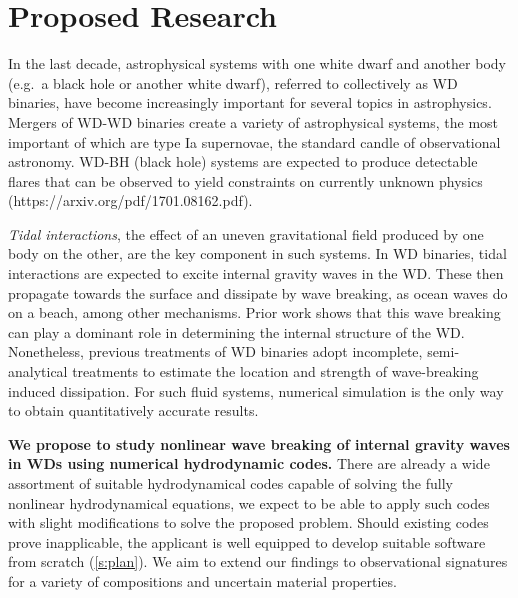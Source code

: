 \documentclass[12pt,
        usenames, %
        dvipsnames %
    ]{article}
\begin{document}
\def\Snospace~{\S{}} %
\renewcommand*{\sectionautorefname}{\Snospace}
\renewcommand*{\appendixautorefname}{\Snospace}
\renewcommand*{\figureautorefname}{Fig.}
\renewcommand*{\equationautorefname}{Eq.}
\renewcommand*{\tableautorefname}{Tab.}

\doublespacing


\section{Proposed Research}

In the last decade, astrophysical systems with one white dwarf and another
body (e.g.\ a black hole or another white dwarf), referred to collectively as WD
binaries, have become increasingly important for several topics in astrophysics.
Mergers of WD-WD binaries create a variety of astrophysical systems, the most
important of which are type Ia supernovae, the standard candle of observational
astronomy. WD-BH (black hole) systems are expected to produce detectable flares
that can be observed to yield constraints on currently unknown physics
(https://arxiv.org/pdf/1701.08162.pdf).

\emph{Tidal interactions}, the effect of an uneven gravitational field produced
by one body on the other, are the key component in such systems. In WD binaries,
tidal interactions are expected to excite internal gravity waves in the WD\@.
These then propagate towards the surface and dissipate by wave breaking, as ocean
waves do on a beach, among other mechanisms.
Prior work shows that this wave breaking can play a dominant role in determining
the internal structure of the WD\@. Nonetheless, previous treatments of WD
binaries adopt incomplete, semi-analytical treatments to estimate the location
and strength of wave-breaking induced dissipation. For such fluid systems,
numerical simulation is the only way to obtain quantitatively accurate results.

\textbf{We propose to study nonlinear wave breaking of internal gravity waves in
WDs using numerical hydrodynamic codes.} There are already a wide assortment of
suitable hydrodynamical codes
capable of solving the fully nonlinear hydrodynamical equations, we expect to be
able to apply such codes with slight modifications to solve the proposed
problem. Should existing codes prove inapplicable, the applicant is well
equipped to develop suitable software from scratch (\autoref{s:plan}). We aim
to extend our findings to observational signatures for a variety of compositions
and uncertain material properties.
\end{document}
